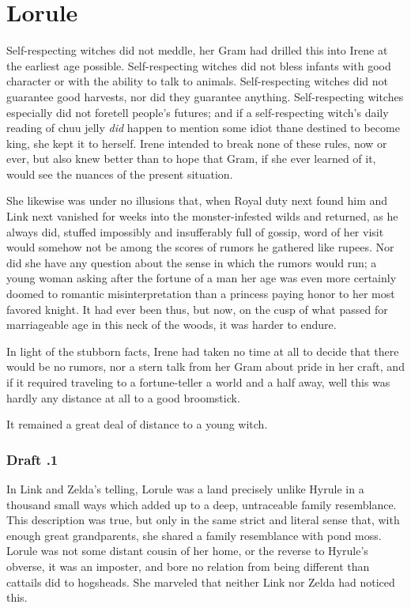 \documentclass[../FGP.tex]{subfiles}
\begin{document}
\section{Lorule}\begin{fragment}\label{nofortunes}Self-respecting witches did not meddle, her Gram had drilled this into Irene at the earliest age possible. Self-respecting witches did not bless infants with good character or with the ability to talk to animals. Self-respecting witches did not guarantee good harvests, nor did they guarantee anything. Self-respecting witches especially did not foretell people's futures; and if a self-respecting witch's daily reading of chuu jelly \emph{did} happen to mention some idiot thane destined to become king, she kept it to herself. Irene intended to break none of these rules, now or ever, but also knew better than to hope that Gram, if she ever learned of it, would see the nuances of the present situation.

She likewise was under no illusions that, when Royal duty next found him and Link next vanished for weeks into the monster-infested wilds and returned, as he always did, stuffed impossibly and insufferably full of gossip, word of her visit would somehow not be among the scores of rumors he gathered like rupees. Nor did she have any question about the sense in which the rumors would run; a young woman asking after the fortune of a man her age was even more certainly doomed to romantic misinterpretation than a princess paying honor to her most favored knight. It had ever been thus, but now, on the cusp of what passed for marriageable age in this neck of the woods, it was harder to endure. 

In light of the stubborn facts, Irene had taken no time at all to decide that there would be no rumors, nor a stern talk from her Gram about pride in her craft, and if it required traveling to a fortune-teller a world and a half away, well this was hardly any distance at all to a good broomstick.

It remained a great deal of distance to a young witch.  

\subsubsection{Draft \thefragment.1} In Link and Zelda's telling, Lorule was a land precisely unlike Hyrule in a thousand small ways which added up to a deep, untraceable family resemblance. This description was true, but only in the same strict and literal sense that, with enough great grandparents, she shared a family resemblance with pond moss. Lorule was not some distant cousin of her home, or the reverse to Hyrule's obverse, it was an imposter, and bore no relation from being different than cattails did to hogsheads. She marveled that neither Link nor Zelda had noticed this. 


\end{fragment}
\end{document}
